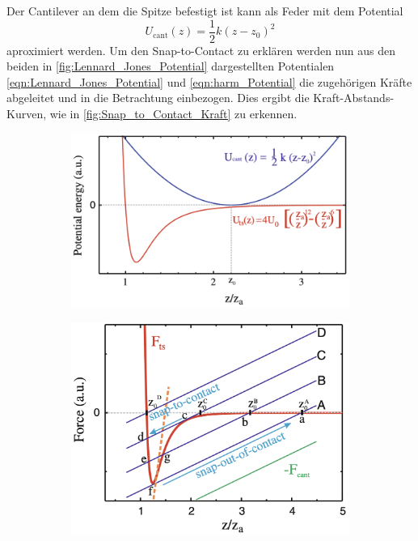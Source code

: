     Der Cantilever an dem die Spitze befestigt ist kann als Feder mit dem Potential
    \begin{equation}
        U_{\mathrm{cant}}(z) = \frac{1}{2}k(z - z_0)^2
        \label{eqn:harm_Potential}
    \end{equation}
    aproximiert werden.
    Um den Snap-to-Contact zu erklären werden nun aus den beiden in \autoref{fig:Lennard_Jones_Potential} dargestellten Potentialen \eqref{eqn:Lennard_Jones_Potential} und \eqref{eqn:harm_Potential} die zugehörigen Kräfte abgeleitet und in die Betrachtung einbezogen.
    Dies ergibt die Kraft-Abstands-Kurven, wie in \autoref{fig:Snap_to_Contact_Kraft} zu erkennen.
    \begin{figure}
        \centering
        \begin{subfigure}{0.49\textwidth}
            \includegraphics[width = \textwidth]{bilder/Snap_to_Contact_Potential.png}
            \caption{}
            \label{fig:Snap_to_Contact_Potential}
        \end{subfigure}
        \hfill
        \begin{subfigure}{0.49\textwidth}
            \includegraphics[width = \textwidth]{bilder/Snap_to_Contact_Kraft.png}

\end{subfigure}
\end{figure}
